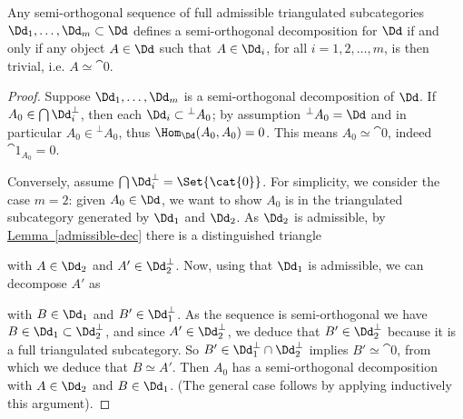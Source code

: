\begin{lemma}
    Any semi-orthogonal sequence of full admissible triangulated subcategories
    $\Dd_{1}, \dots, \Dd_{m} \subset \Dd$ defines a semi-orthogonal
    decomposition for $\Dd$ if and only if any object $A \in \Dd$ such that
    $A \in \Dd_{i}$, for all $i=1,2, \dots, m$, 
    is then trivial, i.e. $A \simeq \cat{0}$.
    \begin{proof}
        Suppose $\Dd_{1}, \dots, \Dd_{m}$ is a semi-orthogonal 
        decomposition of $\Dd$. 
        If $A_{0} \in \bigcap \Dd_{i}^{\perp}$, 
        then each $\Dd_{i} \subset {}^{\perp}A_{0}$;
        by assumption ${}^{\perp}A_{0} = \Dd$ and in particular
        $A_{0} \in {}^{\perp}A_{0}$, thus $\Hom_{\Dd}(A_{0},A_{0}) = 0$.
        This means $A_{0} \simeq \cat{0}$, indeed $\cat{1}_{A_{0}} = 0$.

        Conversely, assume $\bigcap \Dd_{i}^{\perp} = \Set{\cat{0}}$.
        For simplicity, we consider the case $m=2$: given $A_{0} \in \Dd$,
        we want to show $A_{0}$ is in the triangulated subcategory
        generated by $\Dd_{1}$ and $\Dd_{2}$.
        As $\Dd_{2}$ is admissible, 
        by \hyperref[admissible-dec]{Lemma~\ref*{admissible-dec}}
        there is a distinguished triangle
        \begin{center}
        \end{center}
        with $A \in \Dd_{2}$ and $A' \in \Dd_{2}^{\perp}$.
        Now, using that $\Dd_{1}$ is admissible, 
        we can decompose $A'$ as
        \begin{center}
        \end{center}
        with $B \in \Dd_{1}$ and $B' \in \Dd_{1}^{\perp}$.
        As the sequence is semi-orthogonal we have
        $B \in \Dd_{1} \subset \Dd_{2}^{\perp}$,
        and since $A' \in \Dd_{2}^{\perp}$, 
        we deduce that $B' \in \Dd_{2}^{\perp}$
        because it is a full triangulated subcategory.
        So $B' \in \Dd_{1}^{\perp} \cap \Dd_{2}^{\perp}$
        implies $B' \simeq \cat{0}$, from which we deduce
        that $B \simeq A'$. 
        Then $A_{0}$ has a semi-orthogonal decomposition
        with $A \in \Dd_{2}$ and $B \in \Dd_{1}$.
        (The general case follows by applying inductively this argument).
    \end{proof}
\end{lemma}

